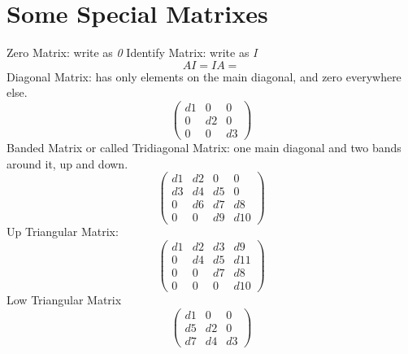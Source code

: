 \documentclass[a4paper,10pt]{article}
\begin{document}
\section{Some Special Matrixes}
Zero Matrix: write as \emph{0}
Identify Matrix: write as \emph{I}
$$AI = IA = $$
Diagonal Matrix: has only elements on the main diagonal, and zero everywhere else.
\[
\begin{pmatrix}
d1 & 0 & 0 \\
0 & d2 & 0 \\
0 & 0 & d3 
\end{pmatrix}
\]
Banded Matrix or called Tridiagonal Matrix: one main diagonal and two bands around it, up and down.
\[
\begin{pmatrix}
d1 & d2 & 0 & 0 \\
d3 & d4 & d5 & 0 \\
0 & d6 & d7 & d8 \\
0 & 0 & d9 & d10
\end{pmatrix}
\]
Up Triangular Matrix:
\[
\begin{pmatrix}
d1 & d2 & d3 & d9 \\
0 & d4 & d5 & d11 \\
0 & 0& d7 & d8 \\
0 & 0 & 0 & d10
\end{pmatrix}
\]
Low Triangular Matrix
\[
\begin{pmatrix}
d1 & 0 & 0 \\
d5 & d2 & 0 \\
d7 & d4 & d3 
\end{pmatrix}
\]
\end{document}

